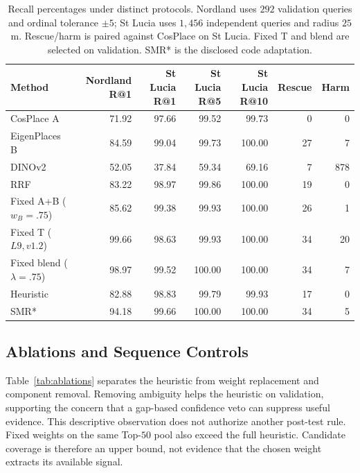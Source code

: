 \documentclass[conference]{IEEEtran}
\begin{document}
\begin{table}[t]\centering\small
\caption{Recall percentages under distinct protocols. Nordland uses $292$ validation queries and ordinal tolerance $\pm5$; St Lucia uses $1,456$ independent queries and radius $25$ m. Rescue/harm is paired against CosPlace on St Lucia. Fixed T and blend are selected on validation. SMR* is the disclosed code adaptation.}\label{tab:accuracy}
\begin{tabular}{lrrrrrr}\toprule
Method & Nordland R@1 & St Lucia R@1 & St Lucia R@5 & St Lucia R@10 & Rescue & Harm\\\midrule
CosPlace A & 71.92 & 97.66 & 99.52 & 99.73 & 0 & 0\\
EigenPlaces B & 84.59 & 99.04 & 99.73 & 100.00 & 27 & 7\\
DINOv2 & 52.05 & 37.84 & 59.34 & 69.16 & 7 & 878\\
RRF & 83.22 & 98.97 & 99.86 & 100.00 & 19 & 0\\
Fixed A+B ($w_B=.75$) & 85.62 & 99.38 & 99.93 & 100.00 & 26 & 1\\
Fixed T ($L9,v1.2$) & 99.66 & 98.63 & 99.93 & 100.00 & 34 & 20\\
Fixed blend ($\lambda=.75$) & 98.97 & 99.52 & 100.00 & 100.00 & 34 & 7\\
Heuristic & 82.88 & 98.83 & 99.79 & 99.93 & 17 & 0\\
SMR* & 94.18 & 99.66 & 100.00 & 100.00 & 34 & 5\\
\bottomrule\end{tabular}\end{table}

\subsection{Ablations and Sequence Controls}
Table~\ref{tab:ablations} separates the heuristic from weight replacement and component removal. Removing ambiguity helps the heuristic on validation, supporting the concern that a gap-based confidence veto can suppress useful evidence. This descriptive observation does not authorize another post-test rule. Fixed weights on the same Top-$50$ pool also exceed the full heuristic. Candidate coverage is therefore an upper bound, not evidence that the chosen weight extracts its available signal.
\end{document}
